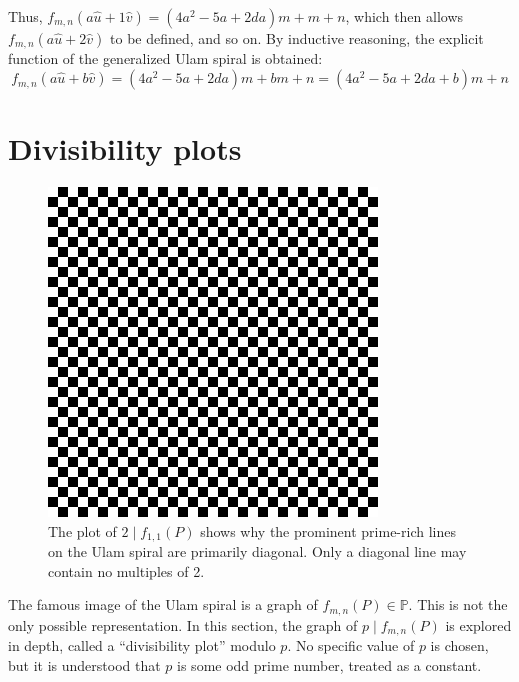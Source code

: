 \documentclass{article}
\begin{document}
Thus, \(f_{m,n}(a\hat{u}+1\hat{v})=(4a^2-5a+2da)m+m+n\), which then allows \(f_{m,n}(a\hat{u}+2\hat{v})\) to be defined, and so on. By inductive reasoning, the explicit function of the generalized Ulam spiral is obtained:
	\[f_{m,n}(a\hat{u}+b\hat{v})=(4a^2-5a+2da)m+bm+n=(4a^2-5a+2da+b)m+n\]
	


\section{Divisibility plots}

\begin{figure}[h!]
	\centering
	\includegraphics[scale=0.4]{div2}
	\caption{The plot of \(2 \mid f_{1,1}(P)\) shows why the prominent prime-rich lines on the Ulam spiral are primarily diagonal. Only a diagonal line may contain no multiples of 2.}
	\label{div2}
\end{figure}

The famous image of the Ulam spiral is a graph of \(f_{m,n}(P) \in \mathbb{P}\). This is not the only possible representation. In this section, the graph of \(p \mid f_{m,n}(P)\) is explored in depth, called a ``divisibility plot'' modulo \(p\). No specific value of \(p\) is chosen, but it is understood that \(p\) is some odd prime number, treated as a constant.
\end{document}
